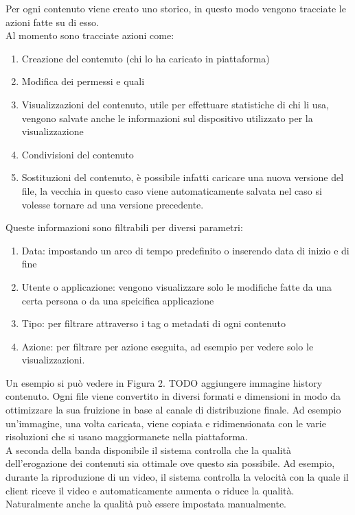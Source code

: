 \documentclass[a4paper, 12pt, twoside, openright]{book}
\begin{document}
Per ogni contenuto viene creato uno storico, in questo modo vengono tracciate le azioni fatte su di esso.\\
Al momento sono tracciate azioni come:
\begin{enumerate}
\item Creazione del contenuto (chi lo ha caricato in piattaforma)
\item Modifica dei permessi e quali
\item Visualizzazioni del contenuto, utile per effettuare statistiche di chi li usa, vengono salvate anche le informazioni sul dispositivo utilizzato per la visualizzazione
\item Condivisioni del contenuto
\item Sostituzioni del contenuto, è possibile infatti caricare una nuova versione del file, la vecchia in questo caso viene automaticamente salvata nel caso si volesse tornare ad una versione precedente.
\end{enumerate}
Queste informazioni sono filtrabili per diversi parametri:
\begin{enumerate}
\item Data: impostando un arco di tempo predefinito o inserendo data di inizio e di fine
\item Utente o applicazione: vengono visualizzare solo le modifiche fatte da una certa persona o da una speicifica applicazione
\item Tipo: per filtrare attraverso i tag o metadati di ogni contenuto
\item Azione: per filtrare per azione eseguita, ad esempio per vedere solo le visualizzazioni.
\end{enumerate}
Un esempio si può vedere in Figura 2. TODO aggiungere immagine history contenuto.
Ogni file viene convertito in diversi formati e dimensioni in modo da ottimizzare la sua fruizione in base al canale di distribuzione finale. Ad esempio un'immagine, una volta caricata, viene copiata e ridimensionata con le varie risoluzioni che si usano maggiormanete nella piattaforma.\\
A seconda della banda disponibile il sistema controlla che la qualità dell'erogazione dei contenuti sia ottimale ove questo sia possibile. Ad esempio, durante la riproduzione di un video, il sistema controlla la velocità con la quale il client riceve il video e automaticamente aumenta o riduce la qualità. Naturalmente anche la qualità può essere impostata manualmente.\\ \\
\end{document}
